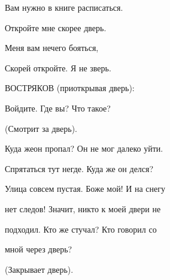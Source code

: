 Вам нужно в книге расписаться.

Откройте мне скорее дверь.

Меня вам нечего бояться,

Скорей откройте. Я не зверь.

\begin{flushleft}ВОСТРЯКОВ (приоткрывая дверь):\end{flushleft}

Войдите. Где вы? Что такое?

\begin{center}(Смотрит за дверь).\end{center}

Куда жеон пропал? Он не мог далеко уйти.

Спрятаться  тут негде. Куда же он делся?

Улица совсем пустая. Боже мой! И на снегу
   
нет следов! Значит, никто к моей двери не

подходил. Кто же стучал? Кто говорил со

мной через дверь?

\begin{center}(Закрывает дверь).\end{center}

\begin{flushright}[1937--1938 гг.]\end{flushright}